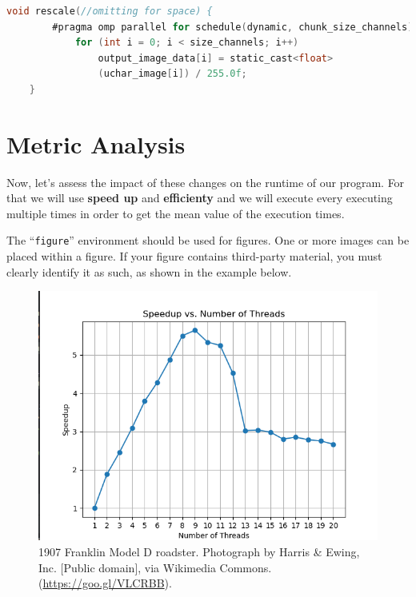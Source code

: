 \documentclass[sigconf]{acmart}
\begin{document}
\begin{lstlisting}[language=C, caption=Rescale Function]
	void rescale(//omitting for space) {
        #pragma omp parallel for schedule(dynamic, chunk_size_channels) num_threads(n_threads)
            for (int i = 0; i < size_channels; i++)
                output_image_data[i] = static_cast<float>
                (uchar_image[i]) / 255.0f;
    }
\end{lstlisting}
\section{Metric Analysis}
Now, let's assess the impact of these changes on the runtime of our program. For that we will use \textbf{speed up} and \textbf{efficienty} and we will execute every executing multiple times in order to get the mean value of the execution times.

The ``\verb|figure|'' environment should be used for figures. One or
more images can be placed within a figure. If your figure contains
third-party material, you must clearly identify it as such, as shown
in the example below.

\begin{figure}[h]
  \centering
  \includegraphics[width=\linewidth]{images/speedup.png}
  \caption{1907 Franklin Model D roadster. Photograph by Harris \&
    Ewing, Inc. [Public domain], via Wikimedia
    Commons. (\url{https://goo.gl/VLCRBB}).}
\end{figure}
\end{document}
